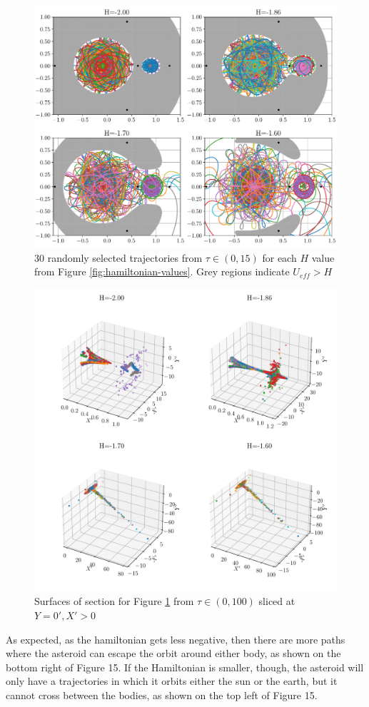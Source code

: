 \documentclass[11pt]{article}
\begin{document}
\begin{figure}[H]
    \centering
    \includegraphics[width=0.6\linewidth]{figures/hamiltonian_trajectories.pdf}
    \caption{30 randomly selected trajectories from $\tau \in (0, 15)$ for each $H$ value from Figure \ref{fig:hamiltonian-values}. Grey regions indicate $U_{eff} > H$}
    \label{fig:hamiltonian-trajectories}
\end{figure}
\begin{figure}[H]
    \centering
    \includegraphics[width=0.6\linewidth]{figures/hamiltonian_state_space.pdf}
    \caption{Surfaces of section for Figure \ref{fig:hamiltonian-trajectories} from $\tau \in (0, 100)$ sliced at $Y=0', X'>0$}
    \label{fig:hamiltonian-state-space}
\end{figure}
\noindent
As expected, as the hamiltonian gets less negative, then there are more paths where the asteroid can escape the orbit around either body, as shown on the bottom right of Figure 15. If the Hamiltonian is smaller, though, the asteroid will only have a trajectories in which it orbits either the sun or the earth, but it cannot cross between the bodies, as shown on the top left of Figure 15. 
\\
\end{document}

